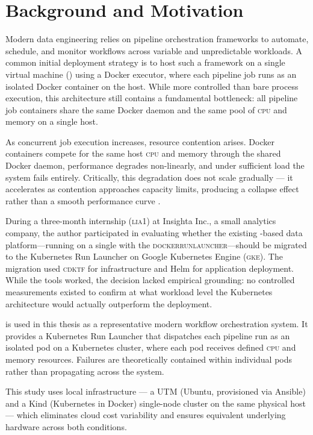 \section{Background and Motivation}

Modern data engineering relies on pipeline orchestration frameworks to automate, schedule,
and monitor workflows across variable and unpredictable workloads. A common initial
deployment strategy is to host such a framework on a single virtual machine (\vm{}) using a
Docker executor, where each pipeline job runs as an isolated Docker container on the \vm{}
host. While more controlled than bare process execution, this architecture still contains a
fundamental bottleneck: all pipeline job containers share the same Docker daemon and the
same pool of \textsc{cpu} and memory on a single host.

As concurrent job execution increases, resource contention arises. Docker containers compete
for the same host \textsc{cpu} and memory through the shared Docker daemon, performance
degrades non-linearly, and under sufficient load the system fails entirely. Critically,
this degradation does not scale gradually --- it accelerates as contention approaches
capacity limits, producing a collapse effect rather than a smooth performance curve
\citep{nanda1991}.

During a three-month internship (\textsc{lia1}) at Insighta Inc., a small analytics
company, the author participated in evaluating whether the existing \dagster{}-based data
platform---running on a single \vm{} with the \textsc{dockerrunlauncher}---should be
migrated to the Kubernetes Run Launcher on Google Kubernetes Engine (\textsc{gke}). The
migration used \textsc{cdktf} for infrastructure and Helm for application deployment.
While the tools worked, the decision lacked empirical grounding: no controlled measurements
existed to confirm at what workload level the Kubernetes architecture would actually
outperform the \vm{} deployment.

\dagster{} is used in this thesis as a representative modern workflow orchestration system.
It provides a Kubernetes Run Launcher that dispatches each pipeline run as an isolated pod
on a Kubernetes cluster, where each pod receives defined \textsc{cpu} and memory resources.
Failures are theoretically contained within individual pods rather than propagating across
the system.

This study uses local infrastructure --- a UTM \vm{} (Ubuntu, provisioned via Ansible)
and a Kind (Kubernetes in Docker) single-node cluster on the same physical host --- which
eliminates cloud cost variability and ensures equivalent underlying hardware across both
conditions.
